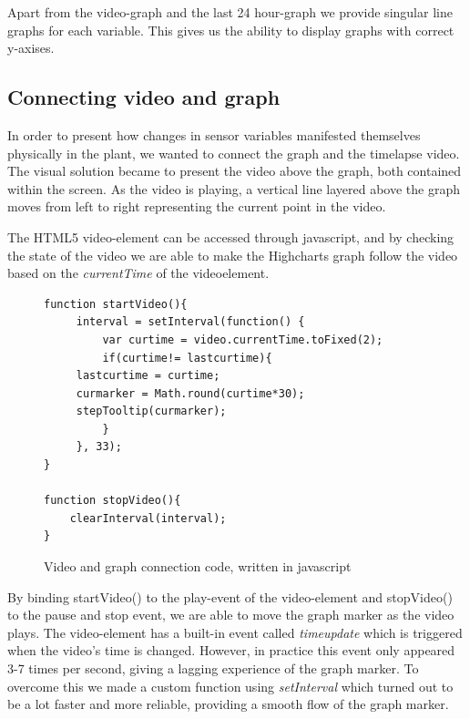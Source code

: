 Apart from the video-graph and the last 24 hour-graph we provide singular line graphs for each variable. This gives us the ability to display graphs with correct y-axises. 

\subsection{Connecting video and graph}
In order to present how changes in sensor variables manifested themselves physically in the plant, we wanted to connect the graph and the timelapse video. The visual solution became to present the video above the graph, both contained within the screen. As the video is playing, a vertical line layered above the graph moves from left to right representing the current point in the video. 

The HTML5 video-element can be accessed through javascript, and by checking the state of the video we are able to make the Highcharts graph follow the video based on the \emph{currentTime} of the videoelement.

\begin{figure}
	\begin{lstlisting}[style=htmlcssjs]
function startVideo(){
	 interval = setInterval(function() {
		 var curtime = video.currentTime.toFixed(2);
		 if(curtime!= lastcurtime){
	 lastcurtime = curtime;
	 curmarker = Math.round(curtime*30);
	 stepTooltip(curmarker);
		 }
	 }, 33);
}

function stopVideo(){
	clearInterval(interval);
}
	\end{lstlisting}
	\caption{Video and graph connection code, written in javascript}
	\label{fig:videocode}
\end{figure}

By binding startVideo() to the play-event of the video-element and stopVideo() to the pause and stop event, we are able to move the graph marker as the video plays. The video-element has a built-in event called \emph{timeupdate} which is triggered when the video's time is changed. However, in practice this event only appeared 3-7 times per second, giving a lagging experience of the graph marker. To overcome this we made a custom function using \emph{setInterval} which turned out to be a lot faster and more reliable, providing a smooth flow of the graph marker. 


